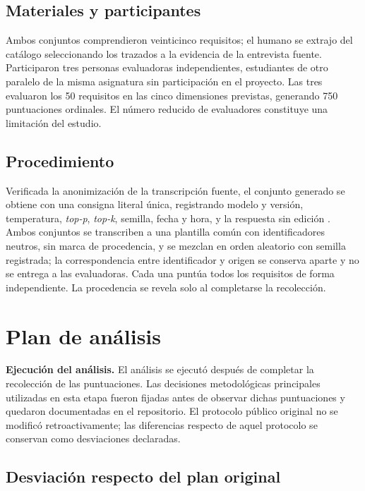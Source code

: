 \documentclass[runningheads]{llncs}
\begin{document}
\subsection{Materiales y participantes}

Ambos conjuntos comprendieron veinticinco requisitos; el humano se extrajo del
cat\'alogo seleccionando los trazados a la evidencia de la entrevista fuente.
Participaron tres personas evaluadoras independientes, estudiantes de otro paralelo
de la misma asignatura sin participaci\'on en el proyecto. Las tres evaluaron los
50 requisitos en las cinco dimensiones previstas, generando 750 puntuaciones
ordinales. El n\'umero reducido de evaluadores constituye una limitaci\'on del
estudio.

\subsection{Procedimiento}

Verificada la anonimizaci\'on de la transcripci\'on fuente, el conjunto generado se
obtiene con una consigna literal \'unica, registrando modelo y versi\'on,
temperatura, \emph{top-p}, \emph{top-k}, semilla, fecha y hora, y la respuesta sin
edici\'on \cite{vogelsang2025}. Ambos conjuntos se transcriben a una plantilla
com\'un con identificadores neutros, sin marca de procedencia, y se mezclan en orden
aleatorio con semilla registrada; la correspondencia entre identificador y origen
se conserva aparte y no se entrega a las evaluadoras. Cada una punt\'ua todos los
requisitos de forma independiente. La procedencia se revela solo al completarse la
recolecci\'on.

\section{Plan de an\'alisis}
\label{sec:analisis}

\textbf{Ejecuci\'on del an\'alisis.} El an\'alisis se ejecut\'o despu\'es de
completar la recolecci\'on de las puntuaciones. Las decisiones metodol\'ogicas
principales utilizadas en esta etapa fueron fijadas antes de observar dichas
puntuaciones y quedaron documentadas en el repositorio. El protocolo p\'ublico
original no se modific\'o retroactivamente; las diferencias respecto de aquel
protocolo se conservan como desviaciones declaradas.

\subsection{Desviaci\'on respecto del plan original}
\end{document}
